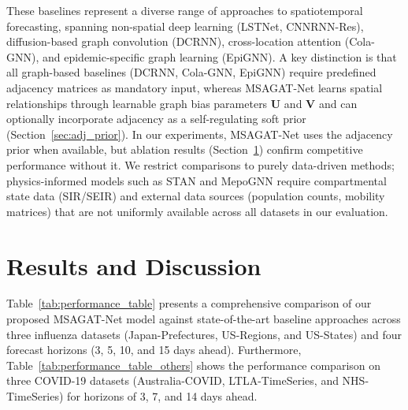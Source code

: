\documentclass[a4paper,fleqn]{cas-dc}
\begin{document}
These baselines represent a diverse range of approaches to spatiotemporal forecasting, spanning non-spatial deep learning (LSTNet, CNNRNN-Res), diffusion-based graph convolution (DCRNN), cross-location attention (Cola-GNN), and epidemic-specific graph learning (EpiGNN). A key distinction is that all graph-based baselines (DCRNN, Cola-GNN, EpiGNN) require predefined adjacency matrices as mandatory input, whereas MSAGAT-Net learns spatial relationships through learnable graph bias parameters $\mathbf{U}$ and $\mathbf{V}$ and can optionally incorporate adjacency as a self-regulating soft prior (Section~\ref{sec:adj_prior}). In our experiments, MSAGAT-Net uses the adjacency prior when available, but ablation results (Section~\ref{sec:results}) confirm competitive performance without it. We restrict comparisons to purely data-driven methods; physics-informed models such as STAN \cite{gao2021stan} and MepoGNN \cite{cao2022mepognn} require compartmental state data (SIR/SEIR) and external data sources (population counts, mobility matrices) that are not uniformly available across all datasets in our evaluation.

\section{Results and Discussion}
\label{sec:results}

Table~\ref{tab:performance_table} presents a comprehensive comparison of our proposed MSAGAT-Net model against state-of-the-art baseline approaches across three influenza datasets (Japan-Prefectures, US-Regions, and US-States) and four forecast horizons (3, 5, 10, and 15 days ahead). Furthermore, Table~\ref{tab:performance_table_others} shows the performance comparison on three COVID-19 datasets (Australia-COVID, LTLA-TimeSeries, and NHS-TimeSeries) for horizons of 3, 7, and 14 days ahead.
\end{document}
